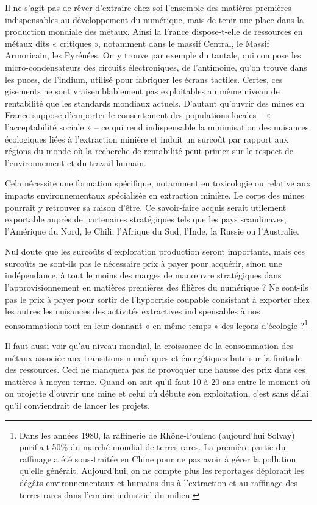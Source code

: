 \documentclass[a4paper]{article}
\begin{document}
Il ne s’agit pas de rêver d’extraire chez soi l’ensemble des matières premières indispensables au développement du numérique, mais de tenir une place dans la production mondiale des métaux. Ainsi la France dispose-t-elle de ressources en métaux dits « critiques », notamment dans le massif Central, le Massif Armoricain, les Pyrénées\cite{brgm2013}. On y trouve par exemple du tantale, qui compose les micro-condensateurs des circuits électroniques, de l’antimoine, qu’on trouve dans les puces, de l’indium, utilisé pour fabriquer les écrans tactiles. Certes, ces gisements ne sont vraisemblablement pas exploitables au même niveau de rentabilité que les standards mondiaux actuels. D’autant qu’ouvrir des mines en France suppose d’emporter le consentement des populations locales – « l’acceptabilité sociale » – ce qui rend indispensable la minimisation des nuisances écologiques liées à l’extraction minière et induit un surcoût par rapport aux régions du monde où la recherche de rentabilité peut primer sur le respect de l’environnement et du travail humain.
 
Cela nécessite une formation spécifique, notamment en toxicologie ou relative aux impacts environnementaux spécialisée en extraction minière. Le corps des mines pourrait y retrouver sa raison d’être. Ce savoir-faire acquis serait utilement exportable auprès de partenaires stratégiques tels que les pays scandinaves, l’Amérique du Nord, le Chili, l’Afrique du Sud, l’Inde, la Russie ou l’Australie.
 
Nul doute que les surcoûts d’exploration production seront importants, mais ces surcoûts ne sont-ils pas le nécessaire prix à payer pour acquérir, sinon une indépendance, à tout le moins des marges de manœuvre stratégiques dans l’approvisionnement en matières premières des filières du numérique ? Ne sont-ils pas le prix à payer pour sortir de l’hypocrisie coupable consistant à exporter chez les autres les nuisances des activités extractives indispensables à nos consommations tout en leur donnant « en même temps » des leçons d’écologie ?\footnote{Dans les années 1980, la raffinerie de Rhône-Poulenc (aujourd'hui Solvay) purifiait 50\% du marché mondial de terres rares. La première partie du raffinage a été sous-traitée en Chine pour ne pas avoir à gérer la pollution qu’elle générait. Aujourd’hui, on ne compte plus les reportages déplorant les dégâts environnementaux et humains dus à l’extraction et au raffinage des terres rares dans l’empire industriel du milieu.}

Il faut aussi voir qu’au niveau mondial, la croissance de la consommation des métaux associée aux transitions numériques et énergétiques bute sur la finitude des ressources. Ceci ne manquera pas de provoquer une hausse des prix dans ces matières à moyen terme. Quand on sait qu’il faut 10 à 20 ans entre le moment où on projette d’ouvrir une mine et celui où débute son exploitation, c’est sans délai qu’il conviendrait de lancer les projets.
\end{document}
